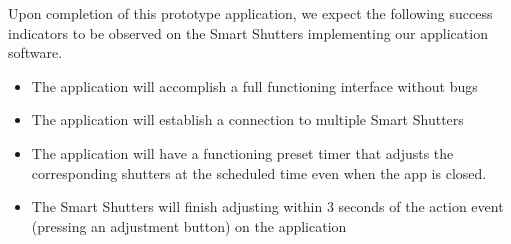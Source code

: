 Upon completion of this prototype application, we expect the following success indicators to be observed on the Smart Shutters implementing our application software. \newline
\begin{itemize}
\item The application will accomplish a full functioning interface without bugs
\item The application will establish a connection to multiple Smart Shutters
\item The application will have a functioning preset timer that adjusts the corresponding shutters at the scheduled time even when the app is closed.
\item The Smart Shutters will finish adjusting within 3 seconds of the action event (pressing an adjustment button) on the application
\end{itemize}
